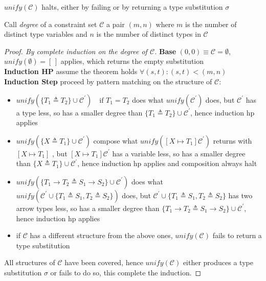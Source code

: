 \documentclass[8pt]{beamer}
\begin{document}
\begin{frame}
    \begin{theorem}
        $unify(\mathcal{C})$ halts, either by failing or by returning a type 
        substitution $\sigma$
    \end{theorem}
    \footnotesize
    Call \emph{degree} of a constraint set $\mathcal{C}$ a pair $(m,n)$ where
    $m$ is the number of distinct type variables and $n$ is the number of
    distinct types in $\mathcal{C}$
    \begin{proof}[Proof. By complete induction on the degree of $\mathcal{C}$]
    \textbf{Base} $(0,0) \equiv \mathcal{C} = \emptyset$, 
        $unify(\emptyset) = [\,]$ applies, which returns the empty substitution\\
    \textbf{Induction HP} assume the theorem holds 
        $\forall (s,t): (s,t) < (m,n)$ \\
    \textbf{Induction Step} proceed by pattern matching on the 
        structure of $\mathcal{C}$: 
        \begin{itemize}
            \item $unify(\{T_1 \triangleq T_2\} \cup \mathcal{C}^{\prime})
                    \quad \text{if } T_1 = T_2$ does what 
                    $unify(\mathcal{C}^{\prime})$ does, but $\mathcal{C}^{\prime}$ 
                    has a type less, so
                    has a smaller degree than $\{T_1 \triangleq T_2\} \cup 
                    \mathcal{C}^{\prime}$, hence induction hp applies 
            \item $unify(\{X \triangleq T_1\} \cup \mathcal{C}^{\prime})$ compose
            what $unify([ X \mapsto T_1]\mathcal{C}^{\prime})$ returns 
            with $[X \mapsto T_1]$ , but 
            $[ X \mapsto T_1]\mathcal{C}^{\prime}$ has a variable less, 
            so has a smaller degree than $\{X \triangleq T_1\} \cup \mathcal{C}^{\prime}$,
            hence induction hp applies and composition always halt
            \item $unify(\{T_1 \rightarrow T_2 \triangleq S_1\rightarrow S_2 \} 
                    \cup \mathcal{C}^{\prime})$ does what
                    $unify(\mathcal{C}^{\prime} \cup \{T_1 \triangleq S_1,
                        T_2 \triangleq S_2\})$ does, but 
                        $\mathcal{C}^{\prime} \cup \{T_1 \triangleq S_1,
                            T_2 \triangleq S_2\}$ has two arrow types less,
                        so has a smaller degree than 
                        $\{T_1 \rightarrow T_2 \triangleq S_1\rightarrow S_2 \} 
                            \cup \mathcal{C}^{\prime}$, hence induction hp applies
            \item if $\mathcal{C}$ has a different structure from the above ones, 
                $unify(\mathcal{C})$ fails to return a type substitution
        \end{itemize}
        All structures of $\mathcal{C}$ have been covered, hence $unify(\mathcal{C})$
        either produces a type substitution $\sigma$ or fails to do so, this complete
        the induction.
    \end{proof}
    \normalsize
\end{frame}
\end{document}
